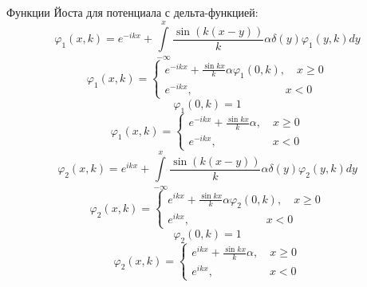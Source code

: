 \documentclass[12pt]{article}
\theoremstyle{definition}
\begin{document}
\begin{itemize}
    Функции Йоста для потенциала с дельта-функцией:
    \begin{equation}
        \varphi_1(x,k)=e^{-ikx}+\int\limits_{-\infty}^x \frac{\sin(k(x-y))}{k}\alpha\delta(y)\varphi_1(y,k)dy
    \end{equation}
    \begin{equation}
        \varphi_1(x,k)=\left\{
        \begin{array}{l}
        e^{-ikx}+\frac{\sin kx}{k}\alpha\varphi_1(0,k),\quad x\geq 0\\
        e^{-ikx},\quad\quad\quad\quad\quad\quad\quad\quad\; x<0
        \end{array}
        \right.
    \end{equation}
    \begin{equation}
        \varphi_1(0,k)=1
    \end{equation}
    \begin{equation}
        \boxed{\varphi_1(x,k)=\left\{
        \begin{array}{l}
        e^{-ikx}+\frac{\sin kx}{k}\alpha,\quad x\geq 0\\
        e^{-ikx},\quad\quad\quad\quad\quad x<0
        \end{array}
        \right.}
    \end{equation}
    \begin{equation}
        \varphi_2(x,k)=e^{ikx}+\int\limits_{-\infty}^x \frac{\sin(k(x-y))}{k}\alpha\delta(y)\varphi_2(y,k)dy
    \end{equation}
    \begin{equation}
        \varphi_2(x,k)=\left\{
        \begin{array}{l}
        e^{ikx}+\frac{\sin kx}{k}\alpha\varphi_2(0,k),\quad x\geq 0\\
        e^{ikx},\quad\quad\quad\quad\quad\quad\;\;\; x<0
        \end{array}
        \right.
    \end{equation}
    \begin{equation}
        \varphi_2(0,k)=1
    \end{equation}
    \begin{equation}
        \boxed{\varphi_2(x,k)=\left\{
        \begin{array}{l}
        e^{ikx}+\frac{\sin kx}{k}\alpha,\quad x\geq 0\\
        e^{ikx},\quad\quad\quad\quad\quad x<0
        \end{array}
        \right.}
    \end{equation}

\end{itemize}
\end{document}
